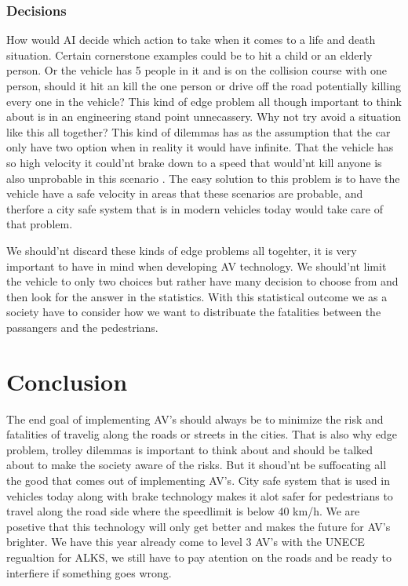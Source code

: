 \documentclass[conference]{IEEEtran}
\begin{document}
	\subsubsection{Decisions}
		How would AI decide which action to take when it comes to a life and death situation. Certain 
		cornerstone examples could be to hit a child or an elderly person. Or the vehicle has 5 people in it and is on the collision course
		with one person, should it hit an kill the one person or drive off the road potentially killing every one in the vehicle? 
		This kind of edge problem all though important to think about is in an engineering stand point unnecassery. Why not try avoid a situation 
		like this all together? This kind of dilemmas has as the assumption that the car only have two option when in reality it would have infinite.
		That the vehicle has so high velocity it could'nt brake down to a speed that would'nt kill anyone is also unprobable in this scenario \cite{IEEE:ethics}. 
		The easy solution to this problem is to have the vehicle have a safe velocity in areas that these scenarios are probable, and therfore a city safe system
		that is in modern vehicles today would take care of that problem.

		We should'nt discard these kinds of edge problems all togehter, it is very important to have in mind when developing AV technology. We should'nt limit the 
		vehicle to only two choices but rather have many decision to choose from and then look for the answer in the statistics. With this statistical outcome we as 
		a society have to consider how we want to distribuate the fatalities between the passangers and the pedestrians.
		

 


\section{Conclusion}
	The end goal of implementing AV's should always be to minimize the risk and fatalities of travelig along the roads or streets in the cities. That is also why 
	edge problem, trolley dilemmas is important to think about and should be talked about to make the society aware of the risks. But it shoud'nt be suffocating all
	the good that comes out of implementing AV's. City safe system that is used in vehicles today along with brake technology makes it alot safer for pedestrians to 
	travel along the road side where the speedlimit is below 40 km/h. We are posetive that this technology will only get better and makes the future for AV's brighter.
	We have this year already come to level 3 AV's with the UNECE regualtion for ALKS, we still have to pay atention on the roads and be ready to interfiere if something
	goes wrong.  
\end{document}
